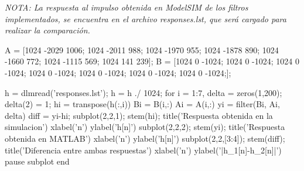 \documentclass[a4paper,12pt]{report}
\begin{document}
\emph{NOTA: La respuesta al impulso obtenida en ModelSIM de los filtros implementados, se encuentra en el archivo responses.lst, que será cargado para realizar la comparación.}

\begin{matlabcode}

A = [1024 -2029 1006;
    1024 -2011 988;
    1024 -1970 955;
    1024 -1878 890;
    1024 -1660 772;
    1024 -1115 569;
    1024 141 239];
B = [1024 0 -1024;
    1024 0 -1024;
    1024 0 -1024;
    1024 0 -1024;
    1024 0 -1024;
    1024 0 -1024;
    1024 0 -1024;];



h = dlmread('responses.lst');
h = h ./ 1024;
for i = 1:7,
    delta = zeros(1,200);
    delta(2) = 1;
    hi = transpose(h(:,i))
    Bi = B(i,:)
    Ai = A(i,:)
    yi = filter(Bi, Ai, delta)
    diff = yi-hi;
    subplot(2,2,1); stem(hi);
    title('Respuesta obtenida en la simulacion')
    xlabel('n')
    ylabel('h[n]')
    subplot(2,2,2); stem(yi);
    title('Respuesta obtenida en MATLAB')
    xlabel('n')
    ylabel('h[n]')
    subplot(2,2,[3:4]); stem(diff);
    title('Diferencia entre ambas respuestas')
    xlabel('n')
    ylabel('|h_1[n]-h_2[n]|')
    pause
    subplot
end

\end{matlabcode}
\clearpage
\end{document}
